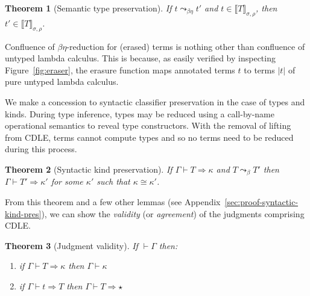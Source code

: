\documentclass{article}
\newcommand{\interp}[1]{\llbracket #1 \rrbracket}
\newcommand{\tpsynth}[0]{\Rightarrow}
\newtheorem{theorem}{Theorem}
\newtheorem{lemma}[theorem]{Lemma}
\begin{document}
\begin{theorem}[Semantic type preservation]
  If $t \leadsto_{\beta\eta} t'$ and $t\in\interp{T}_{\sigma,\rho}$, then $t'\in\interp{T}_{\sigma,\rho}$.
\end{theorem}

  Confluence of $\beta\eta$-reduction for (erased)
  terms is nothing other than confluence of untyped lambda calculus.
  This is because, as easily verified by inspecting
  Figure~\ref{fig:eraser}, the erasure function maps annotated terms
  $t$ to terms $|t|$ of pure untyped lambda calculus.
\begin{comment}
  \begin{lemma}
    If $t$ is an annotated term of CDLE, then $|t|$ is a term of pure untyped lambda calculus.
    \end{lemma}
\end{comment}    

We make a concession to syntactic classifier preservation in the case of types
and kinds.
During type inference, types may be reduced using a call-by-name operational
semantics to reveal type constructors.
With the removal of lifting from CDLE, terms cannot compute types and so no
terms need to be reduced during this process.

\begin{theorem}[Syntactic kind preservation]
  \label{thm:syntactic-kind-pres}
  If \(\Gamma \vdash T \tpsynth \kappa\) and \(T \leadsto_{\beta} T'\) then
  \(\Gamma \vdash T' \tpsynth \kappa'\) for some \(\kappa'\) such that \(\kappa
  \cong \kappa'\).
\end{theorem}

From this theorem and a few other lemmas (see
Appendix~\ref{sec:proof-syntactic-kind-pres}), we can show the \emph{validity}
(or \emph{agreement}) of the judgments comprising CDLE.

\begin{theorem}[Judgment validity]
  \label{thm:judge-valid}
  If \(\vdash \Gamma\) then:
  \begin{enumerate}
  \item if \(\Gamma \vdash T \tpsynth \kappa\) then \(\Gamma \vdash \kappa\)
    
  \item if \(\Gamma \vdash t \tpsynth T\) then \(\Gamma \vdash T \tpsynth \star\)
  \end{enumerate}
\end{theorem}
\end{document}
